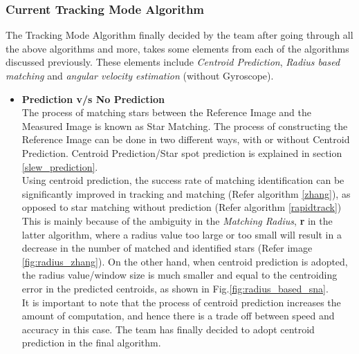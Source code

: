 \documentclass[../../main.tex]{subfiles}
\begin{document}
\subsubsection{Current Tracking Mode Algorithm}
The Tracking Mode Algorithm finally decided by the team after going through all the above algorithms and more, takes some elements from each of the algorithms discussed previously. These elements include \emph{Centroid Prediction}, \emph{Radius based matching} and \emph{angular velocity estimation} (without Gyroscope). 
\begin{itemize}
    \item \textbf{Prediction v/s No Prediction}\\
    The process of matching stars between the Reference Image and the Measured Image is known as Star Matching. The process of constructing the Reference Image can be done in two different ways, with or without Centroid Prediction. Centroid Prediction/Star spot prediction is explained in section \ref{slew_prediction}. \\
    Using centroid prediction, the success rate of matching identification can be significantly improved in tracking and matching (Refer algorithm \ref{zhang}), as opposed to star matching without prediction (Refer algorithm \ref{rapidtrack}) \\
    This is mainly because of the ambiguity in the \emph{Matching Radius}, \textbf{r} in the latter algorithm, where a radius value too large or too small will result in a decrease in the number of matched and identified stars (Refer image \ref{fig:radius_zhang}). On the other hand, when centroid prediction is adopted, the radius value/window size is much smaller and equal to the centroiding error in the predicted centroids, as shown in Fig.\ref{fig:radius_based_sna}. \\
    It is important to note that the process of centroid prediction increases the amount of computation, and hence there is a trade off between speed and accuracy in this case. The team has finally decided to adopt centroid prediction in the final algorithm. 
    

\end{itemize}
\end{document}
